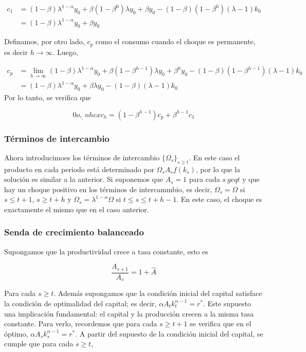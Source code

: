 \documentclass[]{article}
\begin{document}
\[
\begin{align}
c_1 &= (1-\beta)\lambda^{1-\alpha}y_0 + \beta(1-\beta^0)\lambda y_0 + \beta y_0 - (1-\beta)(1-\beta^{0})(\lambda - 1)k_0  \\
&= (1-\beta)\lambda^{1-\alpha} y_0 + \beta y_0
\end{align}
\]

Definamos, por otro lado, \(c_p\) como el consumo cuando el choque es
permanente, es decir \(h \rightarrow \infty\). Luego,

\[
\begin{align}
c_p &= \lim_{h \rightarrow \infty}  (1-\beta)\lambda^{1-\alpha}y_0 + \beta(1-\beta^{h-1})\lambda y_0 + \beta^h y_0 - (1-\beta)(1-\beta^{h-1})(\lambda - 1)k_0 \\
&= (1-\beta)\lambda^{1-\alpha}y_0 + \beta\lambda y_0 - (1-\beta)(\lambda - 1)k_0
\end{align}
\] Por lo tanto, se verifica que

\[0o, _.nh cx
c_h = (1-\beta^{h-1})c_p + \beta^{h-1}c_1
\]

\subsubsection{Términos de intercambio}\label{terminos-de-intercambio-1}

Ahora introducimoes los términos de intercambio
\(\{\Omega_s\}_{s\geq t}\). En este caso el producto en cada periodo
está determinado por \(\Omega_s A_s f(k_s)\), por lo que la solución es
similar a la anterior. Si suponemos que \(A_s = 1\) para cada
\(s \ geq t\) y que hay un choque positivo en los términos de
intercammbio, es decir, \(\Omega_s = \Omega\) si \(s \leq t+1\),
\(s \geq t+h\) y \(\Omega_s = \lambda^{1-\alpha}\Omega\) si
\(t \leq s \leq t+h-1\). En este caso, el choque es exactamente el mismo
que en el caso anterior.

\subsubsection{Senda de crecimiento
balanceado}\label{senda-de-crecimiento-balanceado}

Supongamos que la productividad crece a tasa constante, esto es

\[
\frac{A_{s+1}}{A_s} = 1 + \hat{A}
\]

Para cada \(s \geq t\). Además supongamos que la condición inicial del
capital satisface la condición de optimalidad del capital; es decir,
\(\alpha A_t k_t^{\alpha-1} = r^*\). Este supuesto una implicación
fundamental: el capital y la producción crecen a la misma tasa
constante. Para verlo, recordemos que para cada \(s \geq t+1\) se
verifica que en el óptimo, \(\alpha A_sk_s^{\alpha-1} = r^*\). A partir
del supuesto de la condición inicial del capital, se cumple que para
cada \(s \geq t\),
\end{document}
